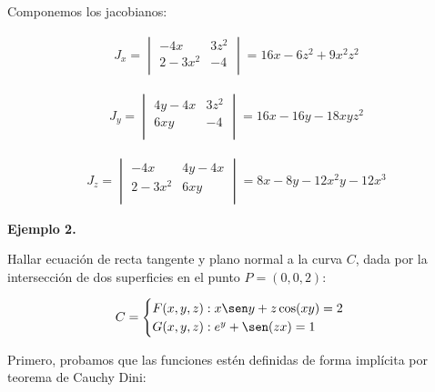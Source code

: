 Componemos los jacobianos:

\begin{align*}
    J_x =
    \begin{vmatrix}
        -4x        & 3z^{2} \\
        2 - 3x^{2} & -4     \\
    \end{vmatrix} = 16x - 6z^{2} + 9x^{2}z^{2}
\end{align*}

\begin{align*}
    J_y =
    \begin{vmatrix}
        4y - 4x & 3z^{2} \\
        6xy     & -4     \\
    \end{vmatrix} = 16x - 16y - 18xyz^{2}
\end{align*}

\begin{align*}
    J_z =
    \begin{vmatrix}
        -4x        & 4y - 4x \\
        2 - 3x^{2} & 6xy     \\
    \end{vmatrix} = 8x - 8y -12x^{2}y - 12x^{3}
\end{align*}

\vspace{.5cm}
\textbf{Ejemplo 2.}

Hallar ecuación de recta tangente y plano normal a la curva \(C\),
dada por la intersección de dos superficies en el punto \(P=(0,0,2)\):

\begin{align*} C =
    \begin{cases}
        F(x,y,z): x\sen y + z\cos(xy) = 2 \\
        G(x,y,z): e^{y} + \sen(zx) = 1
    \end{cases}
\end{align*}

Primero,
probamos que las funciones estén definidas de forma implícita por teorema de
Cauchy Dini:


